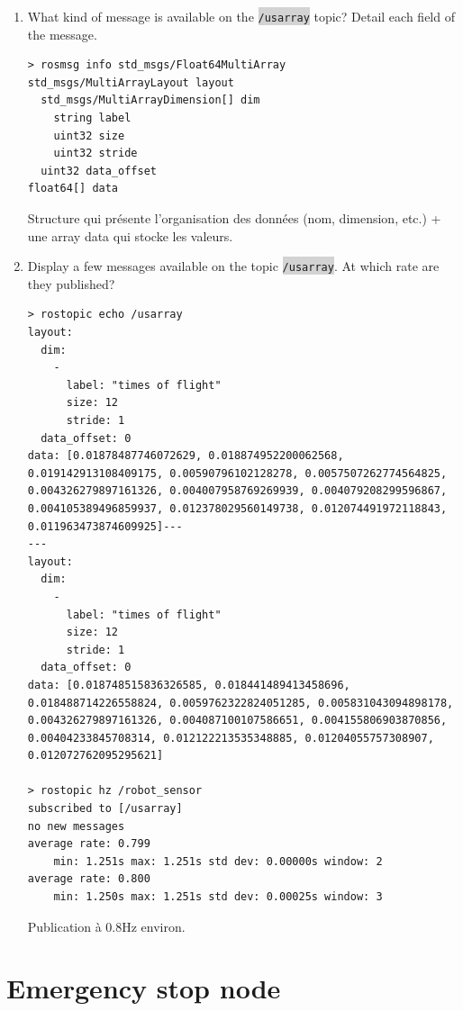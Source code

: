 \documentclass[10pt,a4paper,english]{exam}
\newcounter{mainmemorder}
\newcommand{\save}{\setcounter{mainmemorder}{\value{enumi}}}
\newcommand{\mytext}[1]{\colorbox{lightgray}{\texttt{#1}}}
\begin{document}
\begin{enumerate}
	\item What kind of message is available on the \mytext{/usarray} topic? Detail each field of the
	      message.
	      \begin{solution}
		      \begin{verbatim}
> rosmsg info std_msgs/Float64MultiArray
std_msgs/MultiArrayLayout layout
  std_msgs/MultiArrayDimension[] dim
    string label
    uint32 size
    uint32 stride
  uint32 data_offset
float64[] data
		\end{verbatim}
		      Structure qui présente l'organisation des données (nom, dimension, etc.) + une array data qui stocke
		      les valeurs.
	      \end{solution}
	\item Display a few messages available on the topic \mytext{/usarray}. At which rate are they
	      published?
	      \begin{solution}
		      \begin{verbatim}
> rostopic echo /usarray
layout:
  dim:
    -
      label: "times of flight"
      size: 12
      stride: 1
  data_offset: 0
data: [0.01878487746072629, 0.018874952200062568, 0.019142913108409175, 0.00590796102128278, 0.0057507262774564825, 0.004326279897161326, 0.004007958769269939, 0.004079208299596867, 0.004105389496859937, 0.012378029560149738, 0.012074491972118843, 0.011963473874609925]---
---
layout:
  dim:
    -
      label: "times of flight"
      size: 12
      stride: 1
  data_offset: 0
data: [0.018748515836326585, 0.018441489413458696, 0.018488714226558824, 0.0059762322824051285, 0.005831043094898178, 0.004326279897161326, 0.004087100107586651, 0.004155806903870856, 0.00404233845708314, 0.012122213535348885, 0.01204055757308907, 0.012072762095295621]

> rostopic hz /robot_sensor
subscribed to [/usarray]
no new messages
average rate: 0.799
	min: 1.251s max: 1.251s std dev: 0.00000s window: 2
average rate: 0.800
	min: 1.250s max: 1.251s std dev: 0.00025s window: 3\end{verbatim}
		      Publication à 0.8Hz environ.
	      \end{solution}
	      \save
\end{enumerate}

\section{Emergency stop node}
\end{document}
